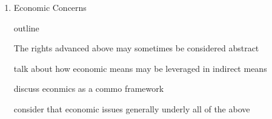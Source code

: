 \begin{enumerate}
  \item Economic Concerns
    \begin{pointenv}
      \large outline

      The rights advanced above may sometimes be considered abstract

      talk about how economic means may be leveraged in indirect 
      means

      discuss econmics as a commo framework

      consider that economic issues generally underly all of the above
    \end{pointenv}
\end{enumerate}

